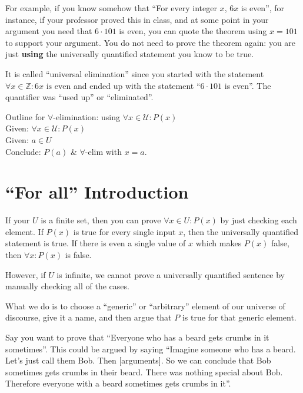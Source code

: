 For example, if you know somehow that ``For every integer $x$, $6x$ is even'', for instance, if your professor proved this in class,  and at some point in your argument you need that $6 \cdot 101$ is even, you can  quote the theorem using $x = 101$ to support your argument.  You do not need to prove the theorem again:  you are just \textbf{using} the universally quantified statement you know to be true.

It is called ``universal elimination'' since you started with the statement $\forall x \in \mathbb{Z}: 6x \textrm{ is even}$ and ended up with the statement ``$6 \cdot 101$ is even''.  The quantifier was ``used up'' or ``eliminated''.

\begin{fitch*}
	\textrm{Outline for $\forall$-elimination:  using $\forall x \in \mathcal{U}: P(x)$}\\
	 \hspace{1 cm}\textrm{Given:  $\forall x \in \mathcal{U}: P(x)$}\\
	\hspace{1 cm}\textrm{Given:  $a \in U$}\\
	\hspace{1 cm}\textrm{Conclude:  $P(a)$} & $\forall$-elim with $x = a$.
\end{fitch*}

\section{``For all'' Introduction}

If your $U$ is a finite set, then you can prove $\forall x \in U: P(x)$ by just checking each element.  If $P(x)$ is true for every single input $x$, then the universally quantified statement is true.  If there is even a single value of $x$ which makes $P(x)$ false, then $\forall x: P(x)$ is false.

However, if $U$ is infinite, we cannot prove a universally quantified sentence by manually checking all of the cases.  

What we do is to choose a ``generic'' or ``arbitrary'' element of our universe of discourse, give it a name, and then argue that $P$ is true for that generic element. 

Say you want to prove that ``Everyone who has a beard gets crumbs in it sometimes''.  This could be argued by saying ``Imagine someone who has a beard. Let's just call them Bob.  Then [arguments].  So we can conclude that Bob sometimes gets crumbs in their beard.  There was nothing special about Bob.  Therefore everyone with a beard sometimes gets crumbs in it''.

